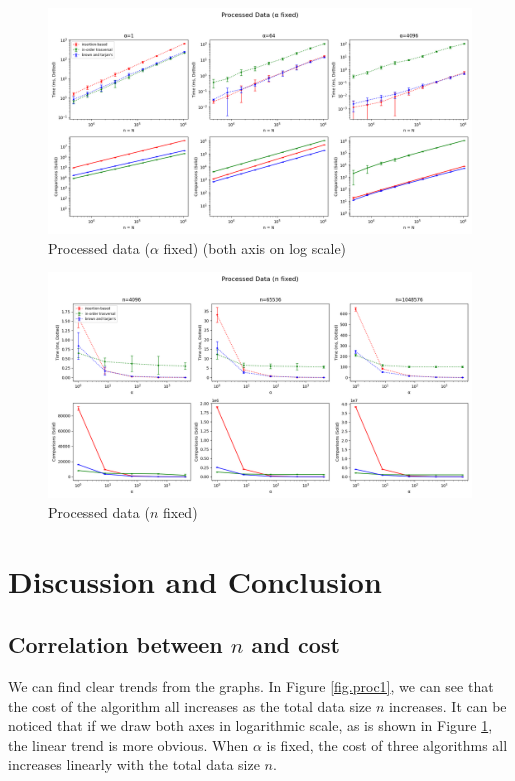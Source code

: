 \documentclass[12pt]{article}
\begin{document}
\begin{figure}
    \centering
    \includegraphics[width=\textwidth]{figure/Processed1(log).png}
    \caption{Processed data ($\alpha$ fixed) (both axis on log scale)}
    \label{fig.proc1log}
\end{figure}

\begin{figure}
    \centering
    \includegraphics[width=\textwidth]{figure/Processed2.png}
    \caption{Processed data ($n$ fixed)}
    \label{fig.proc2}
\end{figure}

\section{Discussion and Conclusion}

\subsection{Correlation between $n$ and cost}

We can find clear trends from the graphs. In Figure \ref{fig.proc1}, we can see that the cost of the algorithm all increases as the total data size $n$ increases. It can be noticed that if we draw both axes in logarithmic scale, as is shown in Figure \ref{fig.proc1log}, the linear trend is more obvious. When $\alpha$ is fixed, the cost of three algorithms all increases linearly with the total data size $n$.
\end{document}
